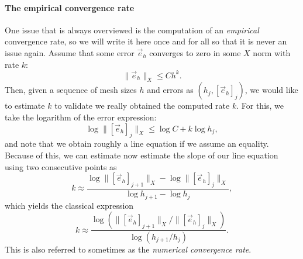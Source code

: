 \paragraph{The empirical convergence rate} One issue that is always overviewed is the computation of an \emph{empirical} convergence rate, so we will write it here once and for all so that it is never an issue again. Assume that some error $\vec e_h$ converges to zero in some $X$ norm with rate $k$:
\begin{equation*}
    \|\vec e_h\|_X \leq C h^k.
\end{equation*}
Then, given a sequence of mesh sizes $h$ and errors as $(h_j, [\vec e_h]_j)$, we would like to estimate $k$ to validate we really obtained the computed rate $k$. For this, we take the logarithm of the error expression:
\begin{equation*}
    \log \|[\vec e_h]_j\|_X \leq \log C + k \log h_j,
\end{equation*}
and note that we obtain roughly a line equation if we assume an equality. Because of this, we can estimate now estimate the slope of our line equation using two consecutive points as
\begin{equation*}
    k \approx \frac{\log \|[\vec e_h]_{j+1}\|_X - \log \|[\vec e_h]_j\|_X}{ \log h_{j+1} - \log h_j},
\end{equation*}
which yields the classical expression
\begin{equation}
    k \approx  \frac{\log \left(\|[\vec e_h]_{j+1}\|_X / \|[\vec e_h]_j\|_X\right)}{ \log \left(h_{j+1} / h_j\right)}.
\end{equation}
This is also referred to sometimes as the \emph{numerical convergence rate}. 


